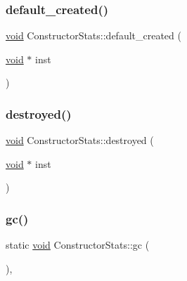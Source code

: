 \mbox{\label{class_constructor_stats_aa4c9bf3190904864a8aba9fdb07de9d0}} 
\subsubsection{\texorpdfstring{default\_created()}{default\_created()}}
{\footnotesize\ttfamily \mbox{\hyperlink{_s_d_l__opengles2__gl2ext_8h_ae5d8fa23ad07c48bb609509eae494c95}{void}} Constructor\+Stats\+::default\+\_\+created (\begin{DoxyParamCaption}\item[{\mbox{\hyperlink{_s_d_l__opengles2__gl2ext_8h_ae5d8fa23ad07c48bb609509eae494c95}{void}} $\ast$}]{inst }\end{DoxyParamCaption})\hspace{0.3cm}{\ttfamily [inline]}}

\mbox{\label{class_constructor_stats_a7e5d603e39065d5247d9acea2245ed1a}} 
\subsubsection{\texorpdfstring{destroyed()}{destroyed()}}
{\footnotesize\ttfamily \mbox{\hyperlink{_s_d_l__opengles2__gl2ext_8h_ae5d8fa23ad07c48bb609509eae494c95}{void}} Constructor\+Stats\+::destroyed (\begin{DoxyParamCaption}\item[{\mbox{\hyperlink{_s_d_l__opengles2__gl2ext_8h_ae5d8fa23ad07c48bb609509eae494c95}{void}} $\ast$}]{inst }\end{DoxyParamCaption})\hspace{0.3cm}{\ttfamily [inline]}}

\mbox{\label{class_constructor_stats_adb2571c4bdda1fadccc7a7a7af5a3bc7}} 
\subsubsection{\texorpdfstring{gc()}{gc()}}
{\footnotesize\ttfamily static \mbox{\hyperlink{_s_d_l__opengles2__gl2ext_8h_ae5d8fa23ad07c48bb609509eae494c95}{void}} Constructor\+Stats\+::gc (\begin{DoxyParamCaption}{ }\end{DoxyParamCaption})\hspace{0.3cm}{\ttfamily [inline]}, {\ttfamily [static]}}

